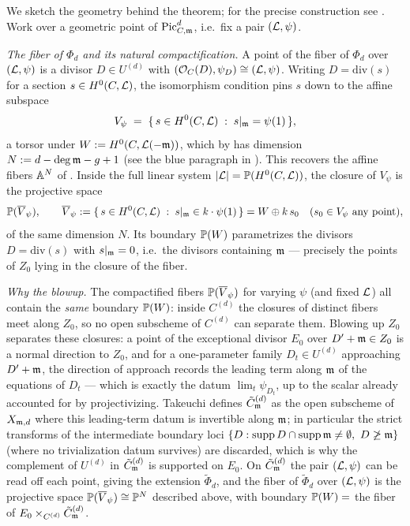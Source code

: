 \begin{bluemath}
\begin{rem*}
We sketch the geometry behind the theorem; for the precise construction see
\cite[Section 3]{takeuchi2019blow}. Work over a geometric point of
$\PicCm[d]$, i.e.\ fix a pair $(\cL, \psi)$.

\emph{The fiber of $\Phi_d$ and its natural compactification.} A point of
the fiber of $\Phi_d$ over $(\cL, \psi)$ is a divisor $D \in U^{(d)}$ with
$(\Oo_C(D), \psi_D) \cong (\cL, \psi)$. Writing $D = \mathrm{div}(s)$ for a
section $s \in H^0(C, \cL)$, the isomorphism condition pins $s$ down to the
affine subspace
\[
V_\psi \;=\; \{\, s \in H^0(C, \cL) \;:\; s|_{\mdls} = \psi(1) \,\},
\]
a torsor under $W := H^0(C, \cL(-\mdls))$, which by
 has dimension $N := d - \deg\mdls - g + 1$
(see the blue paragraph in ). This recovers
the affine fibers $\A^N$ of . Inside the
full linear system $|\cL| = \bP(H^0(C,\cL))$, the closure of $V_\psi$ is the
projective space
\[
\bP(\overline{V}_\psi), \qquad
\overline{V}_\psi := \{\, s \in H^0(C,\cL) \;:\; s|_{\mdls} \in k \cdot \psi(1) \,\}
= W \oplus k\, s_0 \quad (s_0 \in V_\psi \text{ any point}),
\]
of the same dimension $N$. Its boundary $\bP(W)$ parametrizes the divisors
$D = \mathrm{div}(s)$ with $s|_{\mdls} = 0$, i.e.\ the divisors containing
$\mdls$ --- precisely the points of $Z_0$ lying in the closure of the fiber.

\emph{Why the blowup.} The compactified fibers $\bP(\overline{V}_\psi)$ for
varying $\psi$ (and fixed $\cL$) all contain the \emph{same} boundary
$\bP(W)$: inside $C^{(d)}$ the closures of distinct fibers meet along
$Z_0$, so no open subscheme of $C^{(d)}$ can separate them. Blowing up
$Z_0$ separates these closures: a point of the exceptional divisor $E_0$
over $D' + \mdls \in Z_0$ is a normal direction to $Z_0$, and for a
one-parameter family $D_t \in U^{(d)}$ approaching $D' + \mdls$, the
direction of approach records the leading term along $\mdls$ of the
equations of $D_t$ --- which is exactly the datum $\lim_t \psi_{D_t}$, up to
the scalar already accounted for by projectivizing. Takeuchi defines
$\Cmod{d}$ as the open subscheme of $X_{\mdls, d}$ where this leading-term
datum is invertible along $\mdls$; in particular the strict transforms of
the intermediate boundary loci $\{D : \operatorname{supp} D \cap
\operatorname{supp}\mdls \neq \emptyset,\ D \not\geq \mdls\}$ (where no
trivialization datum survives) are discarded, which is why the complement of
$U^{(d)}$ in $\Cmod{d}$ is supported on $E_0$. On $\Cmod{d}$ the pair
$(\cL, \psi)$ can be read off each point, giving the extension
$\tilde{\Phi}_d$, and the fiber of $\tilde{\Phi}_d$ over $(\cL, \psi)$ is
the projective space $\bP(\overline{V}_\psi) \cong \bP^N$ described above,
with boundary $\bP(W) = $ the fiber of $E_0 \times_{C^{(d)}} \Cmod{d}$.
\end{rem*}
\end{bluemath}

